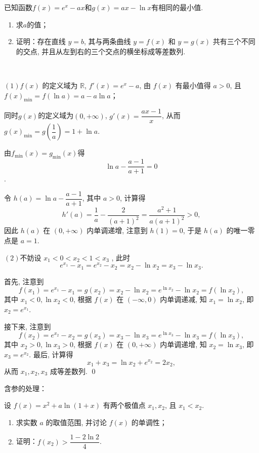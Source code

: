 \begin{example}[2022年新高考I卷]
    已知函数\(f(x)=e^x-ax\)和\(g(x)=ax-\ln x\)有相同的最小值.
    \begin{enumerate}
        \item 求\(a\)的值；
        \item 证明：存在直线 $y = b$, 其与两条曲线 $y = f(x)$ 和 $y = g(x)$ 共有三个不同的交点, 并且从左到右的三个交点的横坐标成等差数列. 
    \end{enumerate}
\end{example}
\begin{jie}
\  

\((1)\)$f(x)$ 的定义域为 $\mathbb{R}$, $f'(x) = e^x - a$, 由 $f(x)$ 有最小值得 $a > 0$, 且 $f(x)_{\min} = f(\ln a) = a - a\ln a$；

同时\(g(x)\)的定义域为\((0,+\infty)\), $g'(x) = \dfrac{ax - 1}{x}$, 
从而 $g(x)_{\min} = g\left(\dfrac{1}{a}\right) = 1 + \ln a$. 

由\(f_{\min}(x)=g_{\min}(x)\)得
$$ \ln a - \dfrac{a-1}{a+1} = 0$$. 
            
        令 $h(a) = \ln a - \dfrac{a-1}{a+1}$, 其中 $a > 0$, 计算得
        \[ h'(a) = \frac{1}{a} - \frac{2}{(a+1)^2} = \frac{a^2 + 1}{a(a+1)^2} > 0, \]
        因此 $h(a)$ 在 $(0, +\infty)$ 内单调递增, 注意到 $h(1) = 0$, 于是 $h(a)$ 的唯一零点是 $a = 1$. 
        
\((2)\)不妨设 $x_1 < 0 < x_2 < 1 < x_3$ , 此时
    \[e^{x_1} - x_1 = e^{x_2} - x_2 = x_2 - \ln x_2 = x_3 - \ln x_3. \]

    首先, 注意到
        \[f(x_1) = e^{x_1} - x_1 = g(x_2) = x_2 - \ln x_2 = e^{\ln x_2} - \ln x_2 = f(\ln x_2),\]
    其中 $x_1 < 0, \ln x_2 < 0$, 根据 $f(x)$ 在 $(-\infty, 0)$ 内单调递减, 
    知 $x_1 = \ln x_2$, 即 $x_2 = e^{x_1}$. 
    
    接下来, 注意到
    \[f(x_2) = e^{x_2} - x_2 = g(x_3) = x_3 - \ln x_3 = e^{\ln x_3} - \ln x_3 = f(\ln x_3),  \]
    其中 $x_2 > 0, \ln x_3 > 0$, 根据 $f(x)$ 在 $(0, +\infty)$ 内单调递增, 知 $x_2 = \ln x_3$, 即 $x_3 = e^{x_2}$. 最后, 计算得
     \[x_1 + x_3 = \ln x_2 + e^{x_2} = 2x_2,\]
    从而 $x_1, x_2, x_3$ 成等差数列. 
    \qed
\end{jie}



含参的处理：

\begin{example}[2009 全国 II 理 ]
    设 $f(x) = x^2 + a \ln(1 + x)$ 有两个极值点 $x_1, x_2$, 且 $x_1 < x_2$. 
\begin{enumerate}
    \item 求实数 $a$ 的取值范围, 并讨论 $f(x)$ 的单调性；
    \item 证明：$f(x_2) > \dfrac{1 - 2\ln 2}{4}$. 
\end{enumerate}
\end{example}

